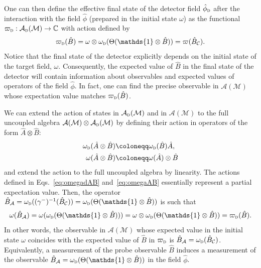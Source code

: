 \documentclass[letterpaper,12pt,titlepage,oneside,final]{book}
\newcommand{\openone}{\mathds{1}}
\newcommand{\M}{\mathcal{M}}
\newcommand{\tc}[1]{\textsc{#1}}
\begin{document}
One can then define the effective final state of the detector field $\hat{\phi}_\tc{d}$ after the interaction with the field $\hat{\phi}$ (prepared in the initial state $\omega$) as the functional $\varpi_\tc{d}:\mathcal{A}_\tc{d}(\M)\rightarrow \mathbb{C}$ with action defined by
\begin{equation}\label{eq:FVuppid}
    \varpi_\tc{d}(\hat{B}) = \omega\otimes\omega_\tc{d}(\Theta(\openone \otimes \hat{B})) = \varpi(\hat{B}_\mathcal{C}).
\end{equation}
Notice that the final state of the detector explicitly depends on the initial state of the target field, $\omega$. Consequently, the expected value of $\hat{B}$ in the final state of the detector will contain information about observables and expected values of operators of the field $\hat{\phi}$. In fact, one can find the precise observable in $\mathcal{A}(\M)$ whose expectation value matches $\varpi_\tc{d}(\hat{B})$. 

We can extend the action of states in $\mathcal{A}_\tc{d}(\M)$ and in $\mathcal{A}(\M)$ to the full uncoupled algebra $\mathcal{A}(\M)\otimes\mathcal{A}_\tc{d}(\M)$ by defining their action in operators of the form $\hat{A}\otimes \hat{B}$:
\begin{align}
    \omega_{\tc{d}}(\hat{A}\otimes\hat{B}) &\coloneqq \omega_\tc{d}(\hat{B})\hat{A},\label{eq:omegadAB}\\
    \omega(\hat{A}\otimes\hat{B}) &\coloneqq \omega(\hat{A})\otimes \hat{B}\label{eq:omegaAB}
\end{align}
and extend the action to the full uncoupled algebra by linearity. The actions defined in Eqs.~\eqref{eq:omegadAB} and~\eqref{eq:omegaAB} essentially represent a partial expectation value. Then, the operator $\hat{B}_\mathcal{A} = \omega_\tc{d}((\gamma^-)^{-1}(\hat{B}_\mathcal{C})) = \omega_\tc{d}(\Theta(\openone\otimes\hat{B}))$ is such that
\begin{equation}
    \omega(\hat{B}_\mathcal{A}) = \omega(\omega_\tc{d}(\Theta(\openone\otimes\hat{B}))) = \omega\otimes\omega_\tc{d}(\Theta(\openone\otimes\hat{B})) = \varpi_{\tc{d}}(\hat{B}).
\end{equation}
In other words, the observable in $\mathcal{A}(\M)$ whose expected value in the initial state $\omega$ coincides with the expected value of $\hat{B}$ in $\varpi_\tc{d}$ is $\hat{B}_\mathcal{A} = \omega_\tc{d}(\hat{B}_\mathcal{C})$. Equivalently, a measurement of the probe observable $\hat{B}$ induces a measurement of the observable $\hat{B}_\mathcal{A} = \omega_\tc{d}(\Theta(\openone\otimes\hat{B}))$ in the field $\hat{\phi}$.
\end{document}
